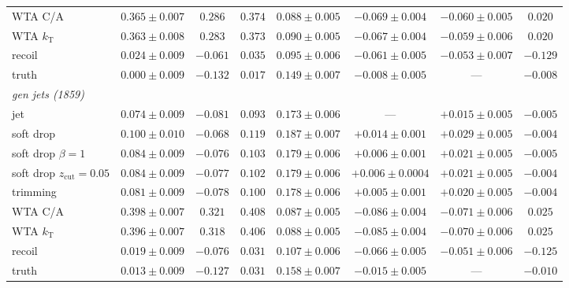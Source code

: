 \begin{table}[htbp]
\begin{tabular}{lccccccc}
WTA C/A & $0.365 \pm 0.007$ & $0.286$ & $0.374$ & $0.088 \pm 0.005$ & $-0.069 \pm 0.004$ & $-0.060 \pm 0.005$ & $0.020$ \\
WTA $k_\mathrm{T}$ & $0.363 \pm 0.008$ & $0.283$ & $0.373$ & $0.090 \pm 0.005$ & $-0.067 \pm 0.004$ & $-0.059 \pm 0.006$ & $0.020$ \\
recoil & $0.024 \pm 0.009$ & $-0.061$ & $0.035$ & $0.095 \pm 0.006$ & $-0.061 \pm 0.005$ & $-0.053 \pm 0.007$ & $-0.129$ \\
truth & $0.000 \pm 0.009$ & $-0.132$ & $0.017$ & $0.149 \pm 0.007$ & $-0.008 \pm 0.005$ & --- & $-0.008$ \\
\midrule
\multicolumn{8}{l}{\emph{gen jets (1859)}} \\
jet & $0.074 \pm 0.009$ & $-0.081$ & $0.093$ & $0.173 \pm 0.006$ & --- & $+0.015 \pm 0.005$ & $-0.005$ \\
soft drop & $0.100 \pm 0.010$ & $-0.068$ & $0.119$ & $0.187 \pm 0.007$ & $+0.014 \pm 0.001$ & $+0.029 \pm 0.005$ & $-0.004$ \\
soft drop $\beta = 1$ & $0.084 \pm 0.009$ & $-0.076$ & $0.103$ & $0.179 \pm 0.006$ & $+0.006 \pm 0.001$ & $+0.021 \pm 0.005$ & $-0.005$ \\
soft drop $z_\mathrm{cut} = 0.05$ & $0.084 \pm 0.009$ & $-0.077$ & $0.102$ & $0.179 \pm 0.006$ & $+0.006 \pm 0.0004$ & $+0.021 \pm 0.005$ & $-0.004$ \\
trimming & $0.081 \pm 0.009$ & $-0.078$ & $0.100$ & $0.178 \pm 0.006$ & $+0.005 \pm 0.001$ & $+0.020 \pm 0.005$ & $-0.004$ \\
WTA C/A & $0.398 \pm 0.007$ & $0.321$ & $0.408$ & $0.087 \pm 0.005$ & $-0.086 \pm 0.004$ & $-0.071 \pm 0.006$ & $0.025$ \\
WTA $k_\mathrm{T}$ & $0.396 \pm 0.007$ & $0.318$ & $0.406$ & $0.088 \pm 0.005$ & $-0.085 \pm 0.004$ & $-0.070 \pm 0.006$ & $0.025$ \\
recoil & $0.019 \pm 0.009$ & $-0.076$ & $0.031$ & $0.107 \pm 0.006$ & $-0.066 \pm 0.005$ & $-0.051 \pm 0.006$ & $-0.125$ \\
truth & $0.013 \pm 0.009$ & $-0.127$ & $0.031$ & $0.158 \pm 0.007$ & $-0.015 \pm 0.005$ & --- & $-0.010$ \\
\bottomrule
\end{tabular}
\end{table}

